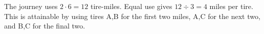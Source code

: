 The journey uses $2\cdot6=12$ tire-miles. Equal use gives $12\div3=\boxed4$ miles per tire. This is attainable by using tires A,B for the first two miles, A,C for the next two, and B,C for the final two.
